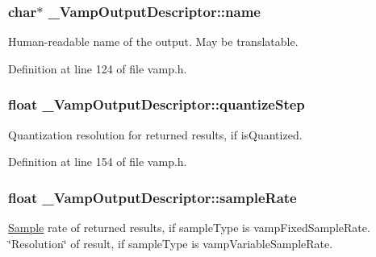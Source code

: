 \subsubsection[{\texorpdfstring{name}{name}}]{ char$\ast$ \+\_\+\+Vamp\+Output\+Descriptor\+::name}\hypertarget{struct___vamp_output_descriptor_af4fca576bd47167fd2bf9b43d588815f}{}\label{struct___vamp_output_descriptor_af4fca576bd47167fd2bf9b43d588815f}
Human-\/readable name of the output. May be translatable. 

Definition at line 124 of file vamp.\+h.

\subsubsection[{\texorpdfstring{quantize\+Step}{quantizeStep}}]{\setlength{\rightskip}{0pt plus 5cm}float \+\_\+\+Vamp\+Output\+Descriptor\+::quantize\+Step}\hypertarget{struct___vamp_output_descriptor_a71aa40222dda4321030cccd0bb655fe3}{}\label{struct___vamp_output_descriptor_a71aa40222dda4321030cccd0bb655fe3}
Quantization resolution for returned results, if is\+Quantized. 

Definition at line 154 of file vamp.\+h.

\subsubsection[{\texorpdfstring{sample\+Rate}{sampleRate}}]{\setlength{\rightskip}{0pt plus 5cm}float \+\_\+\+Vamp\+Output\+Descriptor\+::sample\+Rate}\hypertarget{struct___vamp_output_descriptor_a1ccf193317b2b9c2eb0dbd8dcf61d26e}{}\label{struct___vamp_output_descriptor_a1ccf193317b2b9c2eb0dbd8dcf61d26e}
\hyperlink{struct_sample}{Sample} rate of returned results, if sample\+Type is vamp\+Fixed\+Sample\+Rate. \char`\"{}\+Resolution\char`\"{} of result, if sample\+Type is vamp\+Variable\+Sample\+Rate. 

